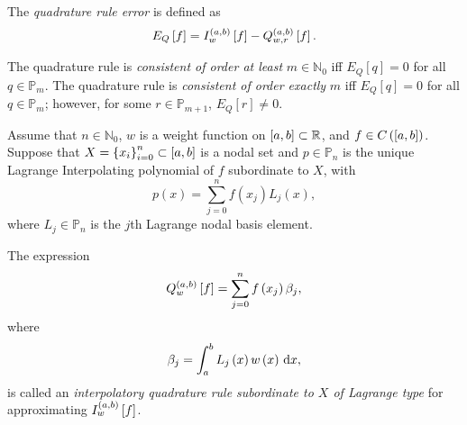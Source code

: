 \begin{frame}

	The \emph{quadrature rule error} is defined as
	\begin{equation*}
		E_{Q}
		\left[f\right]=
		I^{\left(a,b\right)}_{w}
		\left[f\right]-
		Q^{\left(a,b\right)}_{w,r}
		\left[f\right].
	\end{equation*}

	\begin{definition}[consistency]
		The quadrature rule is \emph{consistent of order at least}
		$m\in\mathbb{N}_{0}$ iff $E_{Q}\left[q\right]=0$ for all
		$q\in\mathbb{P}_{m}$.
		The quadrature rule is \emph{consistent of order exactly} $m$
		iff $E_{Q}\left[q\right]=0$ for all $q\in\mathbb{P}_{m}$;
		however, for some $r\in\mathbb{P}_{m+1}$,
		$E_{Q}\left[r\right]\neq 0$.
	\end{definition}

	\begin{definition}
		Assume that $n\in\mathbb{N}_{0}$, $w$ is a weight function on
		$\left[a,b\right]\subset\mathbb{R}$, and $f\in C\left(\left[a,b\right]\right)$.
		Suppose that $X={\left\{x_{i}\right\}}_{i=0}^{n}\subset\left[a,b\right]$ is a nodal set and
		$p\in\mathbb{P}_{n}$ is the unique Lagrange Interpolating
		polynomial of $f$ subordinate to $X$, with
		\begin{equation*}
			p\left(x\right)=
			\sum_{j=0}^{n}
			f\left(x_{j}\right)
			L_{j}\left(x\right),
		\end{equation*}
		where $L_{j}\in\mathbb{P}_{n}$ is the $j$th Lagrange nodal
		basis element.
	\end{definition}
	The expression
	\begin{equation*}
		Q^{\left(a,b\right)}_{w}
		\left[f\right]=
		\sum_{j=0}^{n}
		f\left(x_{j}\right)
		\beta_{j},
	\end{equation*}
	where
	\begin{equation*}
		\beta_{j}=
		\int_{a}^{b}
		L_{j}\left(x\right)
		w\left(x\right)
		\dl x,
	\end{equation*}
	is called an \emph{interpolatory quadrature rule subordinate to $X$ of Lagrange type}
	for approximating
	\begin{math}
		I^{\left(a,b\right)}_{w}
		\left[f\right]
	\end{math}.
\end{frame}

